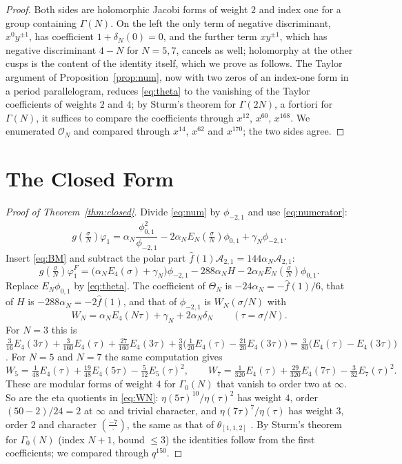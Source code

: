 \documentclass[11pt]{amsart}
\numberwithin{equation}{section}
\theoremstyle{plain}
\theoremstyle{remark}
\newcommand{\cO}{\mathcal{O}}
\newcommand{\cA}{\mathcal{A}}
\newcommand{\pmi}{\phi_{-2,1}}
\newcommand{\pz}{\phi_{0,1}}
\begin{document}
\begin{proof}
Both sides are holomorphic Jacobi forms of weight $2$ and index one for a group containing $\Gamma(N)$. On the left the only term of negative discriminant, $x^0y^{\pm1}$, has coefficient $1+\delta_N(0)=0$, and the further term $xy^{\pm1}$, which has negative discriminant $4-N$ for $N=5,7$, cancels as well; holomorphy at the other cusps is the content of the identity itself, which we prove as follows. The Taylor argument of Proposition~\ref{prop:num}, now with two zeros of an index-one form in a period parallelogram, reduces \eqref{eq:theta} to the vanishing of the Taylor coefficients of weights $2$ and $4$; by Sturm's theorem for $\Gamma(2N)$, a fortiori for $\Gamma(N)$, it suffices to compare the coefficients through $x^{12}$, $x^{60}$, $x^{168}$. We enumerated $\cO_N$ and compared through $x^{14}$, $x^{62}$ and $x^{170}$; the two sides agree.
\end{proof}

\section{The Closed Form}\label{sec:closed}

\begin{proof}[Proof of Theorem~\ref{thm:closed}]
Divide \eqref{eq:num} by $\pmi$ and use \eqref{eq:numerator}:
\[
g(\tfrac\sigma N)\varphi_1=\alpha_N\frac{\pz^2}{\pmi}-2\alpha_NE_N(\tfrac\sigma N)\pz+\gamma_N\pmi.
\]
Insert \eqref{eq:BM} and subtract the polar part $\hat f(1)\cA_{2,1}=144\alpha_N\cA_{2,1}$:
\[
g(\tfrac\sigma N)\varphi^F_1=\bigl(\alpha_NE_4(\sigma)+\gamma_N\bigr)\pmi-288\alpha_NH-2\alpha_NE_N(\tfrac\sigma N)\pz.
\]
Replace $E_N\pz$ by \eqref{eq:theta}. The coefficient of $\Theta_N$ is $-24\alpha_N=-\hat f(1)/6$, that of $H$ is $-288\alpha_N=-2\hat f(1)$, and that of $\pmi$ is $W_N(\sigma/N)$ with
\[
W_N=\alpha_NE_4(N\tau)+\gamma_N+2\alpha_N\delta_N\qquad(\tau=\sigma/N).
\]
For $N=3$ this is $\tfrac{3}{16}E_4(3\tau)+\tfrac3{160}E_4(\tau)+\tfrac{27}{160}E_4(3\tau)+\tfrac38\bigl(\tfrac1{20}E_4(\tau)-\tfrac{21}{20}E_4(3\tau)\bigr)=\tfrac3{80}\bigl(E_4(\tau)-E_4(3\tau)\bigr)$. For $N=5$ and $N=7$ the same computation gives
\[
W_5=\tfrac1{48}E_4(\tau)+\tfrac{19}{48}E_4(5\tau)-\tfrac5{12}E_5(\tau)^2,\qquad
W_7=\tfrac1{320}E_4(\tau)+\tfrac{29}{320}E_4(7\tau)-\tfrac{3}{32}E_7(\tau)^2.
\]
These are modular forms of weight $4$ for $\Gamma_0(N)$ that vanish to order two at $\infty$. So are the eta quotients in \eqref{eq:WN}: $\eta(5\tau)^{10}/\eta(\tau)^2$ has weight $4$, order $(50-2)/24=2$ at $\infty$ and trivial character, and $\eta(7\tau)^7/\eta(\tau)$ has weight $3$, order $2$ and character $\left(\frac{-7}{\cdot}\right)$, the same as that of $\theta_{[1,1,2]}$ \cite[Theorem~1.64]{Ono04}. By Sturm's theorem for $\Gamma_0(N)$ (index $N+1$, bound $\le3$) the identities follow from the first coefficients; we compared through $q^{150}$.
\end{proof}
\end{document}
